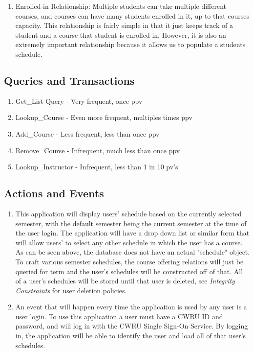 \documentclass[pdftex,12pt,letter]{article}
\begin{document}
\begin{enumerate}[1.]
\item Enrolled-in Relationship: Multiple students can take multiple different courses, and courses can have many students enrolled in it, up to that courses capacity. This relationship is fairly simple in that it just keeps track of a student and a course that student is enrolled in. However, it is also an extremely important relationship because it allows us to populate a students schedule.
\end{enumerate}
\subsection*{Queries and Transactions}
\begin{enumerate}[1.]
\item Get\_List Query - Very frequent, once ppv
\item Lookup\_Course - Even more frequent, multiples times ppv
\item Add\_Course - Less frequent, less than once ppv
\item Remove\_Course - Infrequent, much less than once ppv
\item Lookup\_Instructor - Infrequent, less than 1 in 10 pv's
\end{enumerate}
\subsection*{Actions and Events}
\begin{enumerate}[1.]
\item This application will display users' schedule based on the currently selected semester, with the default semester being the current semester at the time of the user login. The application will have a drop down list or similar form that will allow users' to select any other schedule in which the user has a course. As can be seen above, the database does not have an actual "schedule" object. To craft various semester schedules, the course offering relations will just be queried for term and the user's schedules will be constructed off of that. All of a user's schedules will be stored until that user is deleted, see \textit{Integrity Constraints} for user deletion policies.
\item An event that will happen every time the application is used by any user is a user login. To use this application a user must have a CWRU ID and password, and will log in with the CWRU Single Sign-On Service. By logging in, the application will be able to identify the user and load all of that user's schedules.
\end{enumerate}
\end{document}

